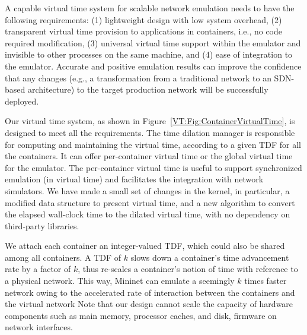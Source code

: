A capable virtual time system for scalable network emulation needs to have the following requirements:
(1) lightweight design with low system overhead,
(2) transparent virtual time provision to applications in containers, i.e., no code required modification,
(3) universal virtual time support within the emulator and invisible to other processes on the same machine, and
(4) ease of integration to the emulator. 
Accurate and positive emulation results can improve the confidence that any changes
(e.g., a transformation from a traditional network to an SDN-based architecture) to the target production network will be successfully deployed. 

\begin{figure*}
\centering
{}
\caption[Virtual Time System Design]{Architecture of the Virtual Time System in a Container-based Network Emulator.
    Note that a typical container-based network emulator can be presented by this figure without the Virtual Time Middleware.}
\label{VT:Fig:ContainerVirtualTime}
\end{figure*}

Our virtual time system, as shown in Figure~\ref{VT:Fig:ContainerVirtualTime}, is designed to meet all the requirements. 
The time dilation manager is responsible for computing and maintaining the virtual time, according to a given TDF for all the containers. 
It can offer per-container virtual time or the global virtual time for the emulator.
The per-container virtual time is useful to support synchronized emulation (in virtual time) and facilitates the integration with network simulators. 
We have made a small set of changes in the kernel, in particular, a modified data structure to present virtual time,
and a new algorithm to convert the elapsed wall-clock time to the dilated virtual time, with no dependency on third-party libraries.

We attach each container an integer-valued TDF, which could also be shared among all containers. 
A TDF of $k$ slows down a container's time advancement rate by a factor of $k$, thus re-scales a container's notion of time with reference to a physical network. 
This way, Mininet can emulate a seemingly $k$ times faster network owing to the accelerated rate of interaction between the containers and the virtual network
Note that our design cannot scale the capacity of hardware components such as main memory, processor caches, and disk, firmware on network interfaces. 

